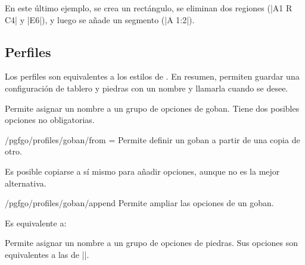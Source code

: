 \begin{goban}[9, stone = {radius = 4pt}, mark = {line = {color = red}}]
En este último ejemplo, se crea un rectángulo, se eliminan dos regiones (|A1 R C4| y |E6|), y luego se añade un segmento (|A 1:2|).

\subsection{Perfiles}
\label{subsec:perfiles}

Los perfiles son equivalentes a los estilos de \tikzname. En resumen, permiten guardar una configuración de tablero y piedras con un nombre y llamarla cuando se desee.

\begin{command}{\pgfgodefinegoban{}}
	Permite asignar un nombre a un grupo de opciones de goban. Tiene dos posibles opciones no obligatorias.
	
	\begin{key}{/pgfgo/profiles/goban/from = }
		Permite definir un goban a partir de una copia de otro.
		\begin{codeexample}
		\end{codeexample}
		
		Es posible copiarse a sí mismo para añadir opciones, aunque no es la mejor alternativa.
		\begin{codeexample}
		\end{codeexample}
	\end{key}
	
	\begin{key}{/pgfgo/profiles/goban/append}
		Permite ampliar las opciones de un goban.
		\begin{codeexample}
		\end{codeexample}
		Es equivalente a:
		\begin{codeexample}
		\end{codeexample}
	\end{key}
\end{command}

\begin{command}{\pgfgodefineplayer{}}
	Permite asignar un nombre a un grupo de opciones de piedras. Sus opciones son equivalentes a las de |\pgfgodefinegoban|.


\end{command}
\end{goban}
